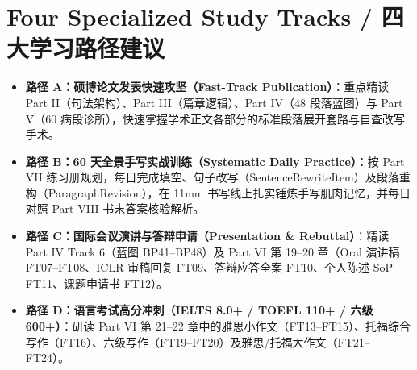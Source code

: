 \section*{Four Specialized Study Tracks / 四大学习路径建议}
\begin{itemize}[leftmargin=1.5em]
  \item \textbf{路径 A：硕博论文发表快速攻坚（Fast-Track Publication）}：重点精读 Part II（句法架构）、Part III（篇章逻辑）、Part IV（48 段落蓝图）与 Part V（60 病段诊所），快速掌握学术正文各部分的标准段落展开套路与自查改写手术。
  \item \textbf{路径 B：60 天全景手写实战训练（Systematic Daily Practice）}：按 Part VII 练习册规划，每日完成填空、句子改写（SentenceRewriteItem）及段落重构（ParagraphRevision），在 11mm 书写线上扎实锤炼手写肌肉记忆，并每日对照 Part VIII 书末答案核验解析。
  \item \textbf{路径 C：国际会议演讲与答辩申请（Presentation \& Rebuttal）}：精读 Part IV Track 6（蓝图 BP41--BP48）及 Part VI 第 19--20 章（Oral 演讲稿 FT07--FT08、ICLR 审稿回复 FT09、答辩应答全案 FT10、个人陈述 SoP FT11、课题申请书 FT12）。
  \item \textbf{路径 D：语言考试高分冲刺（IELTS 8.0+ / TOEFL 110+ / 六级 600+）}：研读 Part VI 第 21--22 章中的雅思小作文（FT13--FT15）、托福综合写作（FT16）、六级写作（FT19--FT20）及雅思/托福大作文（FT21--FT24）。
\end{itemize}
\clearpage